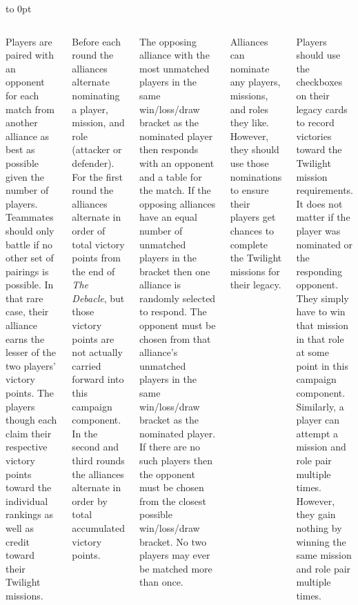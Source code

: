 \vbox to 0pt{}

\clearpage

\begin{columns}


Players are paired with an opponent for each match from another
alliance as best as possible given the number of players.  Teammates
should only battle if no other set of pairings is possible.  In that
rare case, their alliance earns the lesser of the two players' victory
points.  The players though each claim their respective victory points
toward the individual rankings as well as credit toward their Twilight
missions.

Before each round the alliances alternate nominating a player,
mission, and role (attacker or defender).  For the first round the
alliances alternate in order of total victory points from the end of
\emph{The Debacle}, but those victory points are not actually carried
forward into this campaign component.  In the second and third rounds
the alliances alternate in order by total accumulated victory points.

The opposing alliance with the most unmatched players in the same
win/loss/draw bracket as the nominated player then responds with an
opponent and a table for the match.  If the opposing alliances have an
equal number of unmatched players in the bracket then one alliance is
randomly selected to respond.  The opponent must be chosen from that
alliance's unmatched players in the same win/loss/draw bracket as the
nominated player.  If there are no such players then the opponent must
be chosen from the closest possible win/loss/draw bracket.  No two
players may ever be matched more than once.

Alliances can nominate any players, missions, and roles they like.
However, they should use those nominations to ensure their players get
chances to complete the Twilight missions for their legacy.

Players should use the checkboxes on their legacy cards to record
victories toward the Twilight mission requirements.  It does not
matter if the player was nominated or the responding opponent.  They
simply have to win that mission in that role at some point in this
campaign component.  Similarly, a player can attempt a mission and
role pair multiple times.  However, they gain nothing by winning the
same mission and role pair multiple times.

\end{columns}


